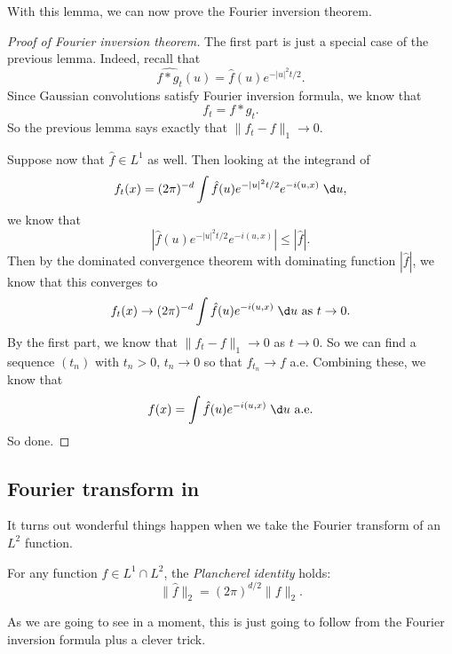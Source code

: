 \documentclass[a4paper]{article}
\begin{document}
With this lemma, we can now prove the Fourier inversion theorem.
\begin{proof}[Proof of Fourier inversion theorem]
  The first part is just a special case of the previous lemma. Indeed, recall that
  \[
    \widehat{f * g_t} (u) = \hat{f}(u) e^{-|u|^2 t/2}.
  \]
  Since Gaussian convolutions satisfy Fourier inversion formula, we know that
  \[
    f_t = f * g_t.
  \]
  So the previous lemma says exactly that $\|f_t - f\|_1 \to 0$.

  Suppose now that $\hat{f} \in L^1$ as well. Then looking at the integrand of
  \[
    f_t(x) = (2\pi)^{-d} \int \hat{f}(u) e^{-|u|^2t/2} e^{-i(u, x)}\;\d u,
  \]
  we know that
  \[
    \left| \hat{f}(u) e^{-|u|^2t/2} e^{-i(u, x)}\right| \leq |\hat{f}|.
  \]
  Then by the dominated convergence theorem with dominating function $|\hat{f}|$, we know that this converges to
  \[
    f_t(x) \to (2\pi)^{-d} \int \hat{f}(u) e^{-i(u, x)}\;\d u\text{ as }t \to 0.
  \]
  By the first part, we know that $\|f_t - f\|_1 \to 0$ as $t \to 0$. So we can find a sequence $(t_n)$ with $t_n > 0$, $t_n \to 0$ so that $f_{t_n} \to f$ a.e. Combining these, we know that
  \[
    f(x) = \int \hat{f}(u) e^{-i(u, x)}\;\d u \text{ a.e.}
  \]
  So done.
\end{proof}

\subsection{Fourier transform in }
It turns out wonderful things happen when we take the Fourier transform of an $L^2$ function.
\begin{thm}
  For any function $f \in L^1 \cap L^2$, the \emph{Plancherel identity} holds:
  \[
    \|\hat{f}\|_2 = (2\pi)^{d/2} \|f\|_2.
  \]
\end{thm}
As we are going to see in a moment, this is just going to follow from the Fourier inversion formula plus a clever trick.
\end{document}
